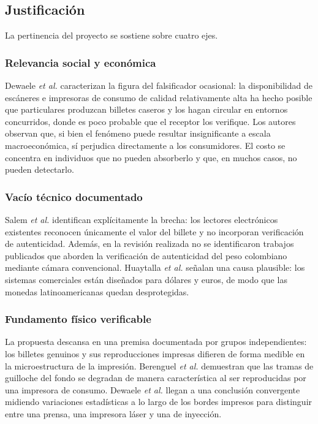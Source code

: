 \documentclass[conference]{IEEEtran}
\begin{document}
\subsection{Justificación}

La pertinencia del proyecto se sostiene sobre cuatro ejes.

\subsubsection{Relevancia social y económica}
Dewaele \textit{et al.} \cite{dewaele2016} caracterizan la figura del
falsificador ocasional: la disponibilidad de escáneres e impresoras de
consumo de calidad relativamente alta ha hecho posible que particulares
produzcan billetes caseros y los hagan circular en entornos concurridos,
donde es poco probable que el receptor los verifique. Los autores
observan que, si bien el fenómeno puede resultar insignificante a escala
macroeconómica, sí perjudica directamente a los consumidores. El costo
se concentra en individuos que no pueden absorberlo y que, en muchos
casos, no pueden detectarlo.

\subsubsection{Vacío técnico documentado}
Salem \textit{et al.} \cite{salem2022} identifican explícitamente la
brecha: los lectores electrónicos existentes reconocen únicamente el
valor del billete y no incorporan verificación de autenticidad. Además,
en la revisión realizada no se identificaron trabajos publicados que
aborden la verificación de autenticidad del peso colombiano mediante
cámara convencional. Huaytalla \textit{et al.} \cite{huaytalla2021}
señalan una causa plausible: los sistemas comerciales están diseñados
para dólares y euros, de modo que las monedas latinoamericanas quedan
desprotegidas.

\subsubsection{Fundamento físico verificable}
La propuesta descansa en una premisa documentada por grupos
independientes: los billetes genuinos y sus reproducciones impresas
difieren de forma medible en la microestructura de la impresión.
Berenguel \textit{et al.} \cite{berenguel2016} demuestran que las tramas
de guilloche del fondo se degradan de manera característica al ser
reproducidas por una impresora de consumo. Dewaele \textit{et al.}
\cite{dewaele2016} llegan a una conclusión convergente midiendo
variaciones estadísticas a lo largo de los bordes impresos para
distinguir entre una prensa, una impresora láser y una de inyección.
\end{document}
